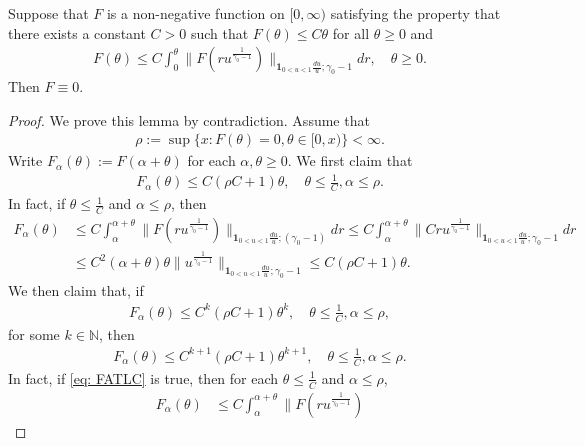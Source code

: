 \begin{lem}\label{lem: F is zero}
	Suppose that $F$ is a non-negative function on $[0,\infty)$ satisfying the property that there exists a constant $C>0$ such that  $F(\theta) \leq C\theta$ for all $\theta \geq 0$ and
\begin{align}
	F(\theta)
	\leq C \int_0^\theta \|  F(ru^{ \frac{1}{\gamma_0- 1}  })\|_{\mathbf 1_{0<u<1}\frac{du}{u}; \gamma_0 - 1} dr, \quad \theta \geq 0.
\end{align}
	Then $F \equiv 0$.
\end{lem}
	
\begin{proof}
    We prove this lemma by contradiction.
	Assume that
\begin{align}\label{eq: definition of rho}
	\rho :=  \sup\{x: F(\theta) = 0, \theta \in [0,x)\} < \infty.
\end{align}
	Write $F_\alpha (\theta) := F(\alpha + \theta)$ for each $\alpha, \theta \geq 0$.
	We first claim that
\begin{align}
	F_\alpha (\theta)
	\leq C(\rho C + 1) \theta,
	\quad \theta \leq \frac{1}{C}, \alpha \leq \rho.
\end{align}
	In fact, if $\theta \leq \frac{1}{C}$ and $\alpha \leq \rho$, then
\begin{align}
	F_\alpha (\theta)
	&\leq C\int_\alpha^{\alpha + \theta} \|F(ru^{\frac{1}{\gamma_0 - 1}}) \|_{\mathbf 1_{0<u<1}\frac{du}{u}; (\gamma_0 - 1)} dr
	\leq C\int_\alpha^{\alpha + \theta} \|Cru^{\frac{1}{\gamma_0 - 1}} \|_{\mathbf 1_{0<u<1}\frac{du}{u}; \gamma_0 - 1} dr
	\\&\leq C^2 (\alpha + \theta) \theta \|u^{\frac{1}{\gamma_0 - 1}} \|_{\mathbf 1_{0<u<1}\frac{du}{u}; \gamma_0 - 1}
	\leq C(\rho C + 1) \theta.
\end{align}
	We then claim that, if
\begin{align}\label{eq: FATLC}
	F_\alpha (\theta)
	\leq C^k(\rho C + 1) \theta^k,
	\quad \theta \leq \frac{1}{C}, \alpha \leq \rho,
\end{align}
	for some $k \in \mathbb N$, then
\begin{align}
	F_\alpha (\theta)
	\leq C^{k+1}(\rho C + 1) \theta^{k+1},
	\quad \theta \leq \frac{1}{C}, \alpha \leq \rho.
	\end{align}
	In fact, if \eqref{eq: FATLC} is true, then for each $\theta \leq \frac{1}{C}$ and $\alpha \leq \rho$,
\begin{align}
	F_\alpha (\theta)
	&\leq C\int_\alpha^{\alpha + \theta} \|F(ru^{\frac{1}{\gamma_0 - 1}})

\end{align}
\end{proof}
